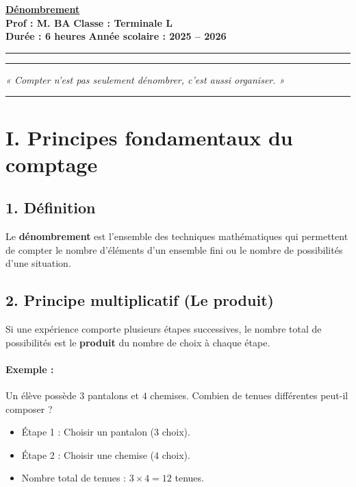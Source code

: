 \documentclass[12pt,a4paper]{article}
\begin{document}
\begin{center}
    \Large\textbf{\underline{\textcolor{myred}{Dénombrement}}}\\[0.2cm]
    \normalsize\textbf{Prof : M. BA} \hfill \textbf{Classe : Terminale L}\\[0.1cm]
    \textbf{Durée : 6 heures} \hfill \textbf{Année scolaire : 2025 -- 2026}
\end{center}
\hrule
\vspace{0.3cm}


\vfill
\hrule
\vspace{0.5cm}
\begin{center}
    \textit{« Compter n'est pas seulement dénombrer, c'est aussi organiser. »}
\end{center}
\vspace{0.5cm}
\hrule
\vfill



\section*{\color{myred}I. Principes fondamentaux du comptage}

\subsection*{\color{myred}1. Définition}
\begin{tcolorbox}[colback=red!5!white,colframe=myred,title=\textbf{Définition}]
Le \textbf{dénombrement} est l'ensemble des techniques mathématiques qui permettent de compter le nombre d'éléments d'un ensemble fini ou le nombre de possibilités d'une situation.
\end{tcolorbox}

\subsection*{\color{myred}2. Principe multiplicatif (Le produit)}

\begin{tcolorbox}[colback=blue!5!white,colframe=myblue,title=\textbf{Principe multiplicatif}]
Si une expérience comporte plusieurs étapes successives, le nombre total de possibilités est le \textbf{produit} du nombre de choix à chaque étape.
\end{tcolorbox}

\paragraph{Exemple :}
Un élève possède $3$ pantalons et $4$ chemises. Combien de tenues différentes peut-il composer ?
\begin{itemize}[label=$\bullet$]
    \item Étape 1 : Choisir un pantalon ($3$ choix).
    \item Étape 2 : Choisir une chemise ($4$ choix).
    \item Nombre total de tenues : $3 \times 4 = 12$ tenues.
\end{itemize}
\end{document}
